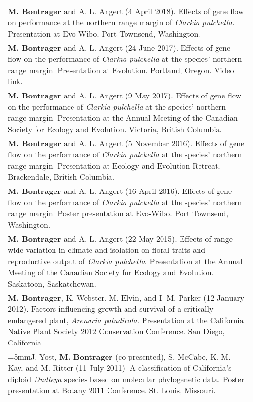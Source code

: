 \documentclass[letterpaper,11pt,oneside]{article}
\begin{document}
\def\arraystretch{1.2}
\noindent \begin{tabular}{@{} >{\raggedright\arraybackslash}p{17.2cm}}
\hangindent=5mm\textbf{M. Bontrager} and A. L. Angert (4 April 2018). Effects of gene flow on performance  at the northern range margin of \textit{Clarkia pulchella}. Presentation at Evo-Wibo. Port Townsend, Washington. \\
\hangindent=5mm\textbf{M. Bontrager} and A. L. Angert (24 June 2017). Effects of gene flow on the performance of \textit{Clarkia pulchella} at the species’ northern range margin. Presentation at Evolution. Portland, Oregon. \href{https://www.youtube.com/watch?v=HqVgQzIJLyA}{Video link.} \\
\hangindent=5mm\textbf{M. Bontrager} and A. L. Angert (9 May 2017). Effects of gene flow on the performance of \textit{Clarkia pulchella} at the species’ northern range margin. Presentation at the Annual Meeting of the Canadian Society for Ecology and Evolution. Victoria, British Columbia. \\
\hangindent=5mm\textbf{M. Bontrager} and A. L. Angert (5 November 2016). Effects of gene flow on the performance of \textit{Clarkia pulchella} at the species’ northern range margin. Presentation at Ecology and Evolution Retreat. Brackendale, British Columbia. \\
\hangindent=5mm\textbf{M. Bontrager} and A. L. Angert (16 April 2016). Effects of gene flow on the performance of \textit{Clarkia pulchella} at the species’ northern range margin. Poster presentation at Evo-Wibo. Port Townsend, Washington. \\
\hangindent=5mm\textbf{M. Bontrager} and A. L. Angert (22 May 2015). Effects of range-wide variation in climate and isolation on floral traits and reproductive output of \textit{Clarkia pulchella}. Presentation at the Annual Meeting of the Canadian Society for Ecology and Evolution. Saskatoon, Saskatchewan. \\
\hangindent=5mm\textbf{M. Bontrager}, K. Webster, M. Elvin, and I. M. Parker (12 January 2012). Factors influencing growth and survival of a critically endangered plant, \textit{Arenaria paludicola}. Presentation at the California Native Plant Society 2012 Conservation Conference. San Diego, California. \\
\hangindent=5mmJ. Yost, \textbf{M. Bontrager} (co-presented), S. McCabe, K. M. Kay, and M. Ritter (11 July 2011). A classification of California’s diploid \textit{Dudleya} species based on molecular phylogenetic data. Poster presentation at Botany 2011 Conference. St. Louis, Missouri. \\
\end{tabular}
\bigskip
\end{document}

